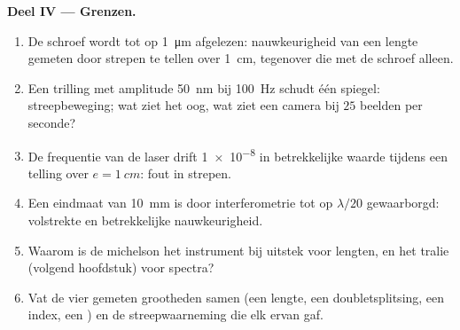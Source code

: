 \begin{problem}
\medskip
\noindent\textbf{Deel IV --- Grenzen.}
\begin{enumerate}[resume]
  \item De schroef wordt tot op \qty{1}{\micro m} afgelezen: nauwkeurigheid
        van een lengte
        gemeten door strepen te tellen over \qty{1}{cm}, tegenover die met
        de schroef
        alleen.
  \item Een trilling met amplitude \qty{50}{nm} bij \qty{100}{Hz} schudt één
        spiegel: streepbeweging; wat ziet het oog, wat ziet een
        camera bij $25$ beelden per seconde?
  \item De frequentie van de laser drift \qty{1e-8}{} in betrekkelijke waarde
        tijdens een telling over $e = \qty{1}{cm}$: fout in strepen.
  \item Een eindmaat van \qty{10}{mm} is door interferometrie tot op $\lambda/20$
        gewaarborgd: volstrekte en betrekkelijke nauwkeurigheid.
  \item Waarom is de michelson het instrument bij uitstek voor lengten, en
        het tralie (volgend hoofdstuk) voor spectra?
  \item Vat de vier gemeten grootheden samen (een lengte, een
        doubletsplitsing, een index, een ) en de
        streepwaarneming die elk ervan gaf.
\end{enumerate}
\end{problem}
